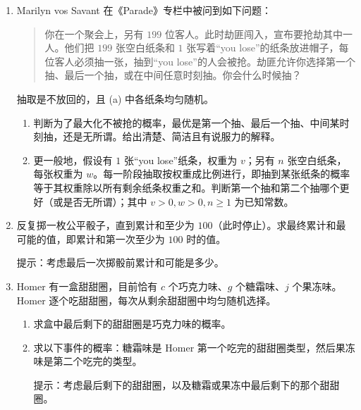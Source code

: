 \documentclass[UTF8, 12pt, fontset=fandol, oneside]{ctexart}
\begin{document}
\begin{enumerate}
  \item Marilyn vos Savant 在《Parade》专栏中被问到如下问题：
  \begin{quote}
  你在一个聚会上，另有 $199$ 位客人。此时劫匪闯入，宣布要抢劫其中一人。他们把 $199$ 张空白纸条和 $1$ 张写着“you lose”的纸条放进帽子，每位客人必须抽一张，抽到“you lose”的人会被抢。劫匪允许你选择第一个抽、最后一个抽，或在中间任意时刻抽。你会什么时候抽？
  \end{quote}
  抽取是不放回的，且 (a) 中各纸条均匀随机。
  \begin{enumerate}
    \item 判断为了最大化不被抢的概率，最优是第一个抽、最后一个抽、中间某时刻抽，还是无所谓。给出清楚、简洁且有说服力的解释。
    \item 更一般地，假设有 $1$ 张“you lose”纸条，权重为 $v$；另有 $n$ 张空白纸条，每张权重为 $w$。每一阶段抽取按权重成比例进行，即抽到某张纸条的概率等于其权重除以所有剩余纸条权重之和。判断第一个抽和第二个抽哪个更好（或是否无所谓）；其中 $v>0,w>0,n\ge 1$ 为已知常数。
  \end{enumerate}

  \item 反复掷一枚公平骰子，直到累计和至少为 $100$（此时停止）。求最终累计和最可能的值，即累计和第一次至少为 $100$ 时的值。

  提示：考虑最后一次掷骰前累计和可能是多少。

  \item Homer 有一盒甜甜圈，目前恰有 $c$ 个巧克力味、$g$ 个糖霜味、$j$ 个果冻味。Homer 逐个吃甜甜圈，每次从剩余甜甜圈中均匀随机选择。
  \begin{enumerate}
    \item 求盒中最后剩下的甜甜圈是巧克力味的概率。
    \item 求以下事件的概率：糖霜味是 Homer 第一个吃完的甜甜圈类型，然后果冻味是第二个吃完的类型。

    提示：考虑最后剩下的甜甜圈，以及糖霜或果冻中最后剩下的那个甜甜圈。
  \end{enumerate}


\end{enumerate}
\end{document}
